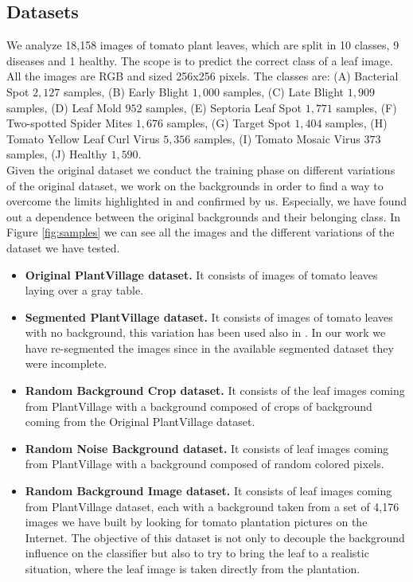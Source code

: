 \subsection{Datasets}
We analyze 18,158 images of tomato plant leaves, which are split in 10 classes, 9 diseases and 1 healthy. The scope is to predict the correct class of a leaf image. All the images are RGB and sized 256x256 pixels.
The classes are: (A) Bacterial Spot $2,127$ samples, (B) Early Blight $1,000$ samples, (C) Late Blight $1,909$ samples, (D) Leaf Mold  $952$ samples, (E) Septoria Leaf Spot $1,771$ samples, (F) Two-spotted Spider Mites $1,676$ samples, (G) Target Spot $1,404$ samples, (H) Tomato Yellow Leaf Curl Virus $5,356$ samples, (I) Tomato Mosaic Virus $373$ samples, (J) Healthy $1,590$.
\\\indent
Given the original dataset we conduct the training phase on different variations of the original dataset, we work on the backgrounds in order to find a way to overcome the limits highlighted in \cite{ref33, ref10} and confirmed by us. Especially, we have found out a dependence between the original backgrounds and their belonging class.
In Figure \ref{fig:samples} we can see all the images and the different variations of the dataset we have tested.
\begin{itemize}
	\item{\textbf{Original PlantVillage dataset.} It consists of images of tomato leaves laying over a gray table.}
	\vspace{-5pt}
	\item{\textbf{Segmented PlantVillage dataset.} It consists of images of tomato leaves with no background, this variation has been used also in \cite{ref10}. In our work we have re-segmented the images since in the available segmented dataset they were incomplete.}
	\vspace{-5pt}
	\item{\textbf{Random Background Crop dataset.} It consists of the leaf images coming from PlantVillage with a background composed of crops of background coming from the Original PlantVillage dataset.}
	\vspace{-5pt}
	\item{\textbf{Random Noise Background dataset.} It consists of leaf images coming from PlantVillage with a background composed of random colored pixels.}
	\vspace{-5pt}
	\item{\textbf{Random Background Image dataset.} It consists of leaf images coming from PlantVillage dataset, each with a background taken from a set of 4,176 images we have built by looking for tomato plantation pictures on the Internet. The objective of this dataset is not only to decouple the background influence on the classifier but also to try to bring the leaf to a realistic situation, where the leaf image is taken directly from the plantation.}
\end{itemize}
